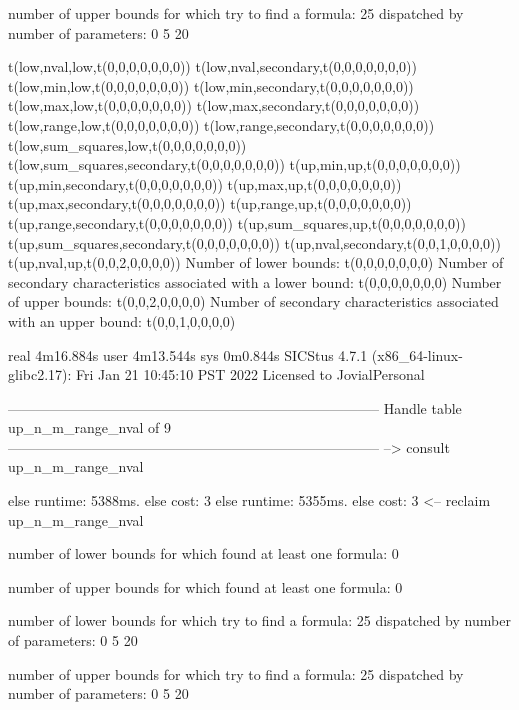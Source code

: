 number of upper bounds for which try to find a formula: 25
dispatched by number of parameters: 0  5  20

t(low,nval,low,t(0,0,0,0,0,0,0))
t(low,nval,secondary,t(0,0,0,0,0,0,0))
t(low,min,low,t(0,0,0,0,0,0,0))
t(low,min,secondary,t(0,0,0,0,0,0,0))
t(low,max,low,t(0,0,0,0,0,0,0))
t(low,max,secondary,t(0,0,0,0,0,0,0))
t(low,range,low,t(0,0,0,0,0,0,0))
t(low,range,secondary,t(0,0,0,0,0,0,0))
t(low,sum_squares,low,t(0,0,0,0,0,0,0))
t(low,sum_squares,secondary,t(0,0,0,0,0,0,0))
t(up,min,up,t(0,0,0,0,0,0,0))
t(up,min,secondary,t(0,0,0,0,0,0,0))
t(up,max,up,t(0,0,0,0,0,0,0))
t(up,max,secondary,t(0,0,0,0,0,0,0))
t(up,range,up,t(0,0,0,0,0,0,0))
t(up,range,secondary,t(0,0,0,0,0,0,0))
t(up,sum_squares,up,t(0,0,0,0,0,0,0))
t(up,sum_squares,secondary,t(0,0,0,0,0,0,0))
t(up,nval,secondary,t(0,0,1,0,0,0,0))
t(up,nval,up,t(0,0,2,0,0,0,0))
Number of lower bounds:                                             t(0,0,0,0,0,0,0)
Number of secondary characteristics associated with a lower bound:  t(0,0,0,0,0,0,0)
Number of upper bounds:                                             t(0,0,2,0,0,0,0)
Number of secondary characteristics associated with an upper bound: t(0,0,1,0,0,0,0)

real	4m16.884s
user	4m13.544s
sys	0m0.844s
SICStus 4.7.1 (x86_64-linux-glibc2.17): Fri Jan 21 10:45:10 PST 2022
Licensed to JovialPersonal


--------------------------------------------------------------------------------
Handle table up_n_m_range_nval of 9
--------------------------------------------------------------------------------
--> consult up_n_m_range_nval

else runtime: 5388ms. else cost: 3
else runtime: 5355ms. else cost: 3
<-- reclaim up_n_m_range_nval

number of lower bounds for which found at least one formula: 0

number of upper bounds for which found at least one formula: 0

number of lower bounds for which try to find a formula: 25
dispatched by number of parameters: 0  5  20

number of upper bounds for which try to find a formula: 25
dispatched by number of parameters: 0  5  20

